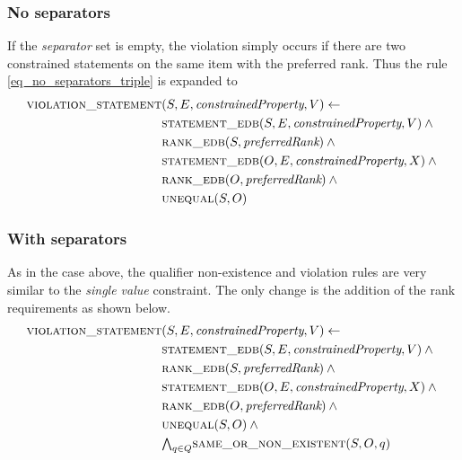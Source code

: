\documentclass[hyperref,bachelorofscience,fleqn]{cgvpub}
\begin{document}
\subsubsection{No separators}
If the \emph{separator} set is empty, the violation simply occurs if there are two constrained statements on the same item with the preferred rank. Thus the rule \eqref{eq_no_separators_triple} is expanded to
\begin{align}
\begin{split}
\textsc{violation\_statement}&(S, E, \emph{constrainedProperty}, V) \leftarrow \\
&\textsc{statement\_edb}(S, E, \emph{constrainedProperty}, V) \wedge{} \\
&\textsc{rank\_edb}(S, \emph{preferredRank}) \wedge{} \\
&\textsc{statement\_edb}(O, E, \emph{constrainedProperty}, X) \wedge{} \\
&\textsc{rank\_edb}(O, \emph{preferredRank}) \wedge{} \\
&\textsc{unequal}(S, O)
\end{split}
\end{align}

\subsubsection{With separators}
As in the case above, the qualifier non-existence and violation rules are very similar to the \emph{single value} constraint. The only change is the addition of the rank requirements as shown below.
\begin{align}
\begin{split}
\textsc{violation\_statement}&(S, E, \emph{constrainedProperty}, V) \leftarrow \\
&\textsc{statement\_edb}(S, E, \emph{constrainedProperty}, V) \wedge{} \\
&\textsc{rank\_edb}(S, \emph{preferredRank}) \wedge{} \\
&\textsc{statement\_edb}(O, E, \emph{constrainedProperty}, X) \wedge{} \\
&\textsc{rank\_edb}(O, \emph{preferredRank}) \wedge{} \\
&\textsc{unequal}(S, O) \wedge{} \\
&{\textstyle\bigwedge}_{q \in Q} \textsc{same\_or\_non\_existent}(S, O, q)
\end{split}
\end{align}
\end{document}
